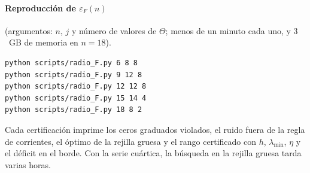 \documentclass[11pt,a4paper]{article}
\theoremstyle{definition}
\theoremstyle{remark}
\newcommand{\eps}{\varepsilon}
\begin{document}
\paragraph{Reproducción de $\eps_F(n)$} (argumentos: $n$, $j$ y número de valores de $\Theta$; menos de un
minuto cada uno, y $3$~GB de memoria en $n=18$).
\begin{verbatim}
python scripts/radio_F.py 6 8 8
python scripts/radio_F.py 9 12 8
python scripts/radio_F.py 12 12 8
python scripts/radio_F.py 15 14 4
python scripts/radio_F.py 18 8 2
\end{verbatim}
Cada certificación imprime los ceros graduados violados, el ruido fuera de la regla de corrientes, el
óptimo de la rejilla gruesa y el rango certificado con $h$, $\lambda_{\min}$, $\eta$ y el déficit en el
borde. Con la serie cuártica, la búsqueda en la rejilla gruesa tarda varias horas.
\end{document}
